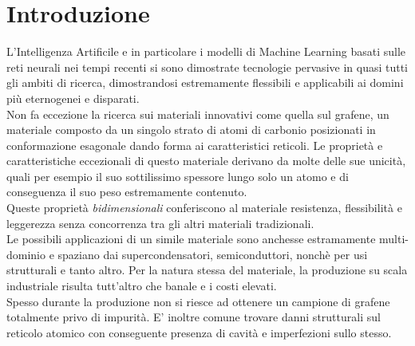 \documentclass[12pt,a4paper,openright,twoside]{report}
\begin{document}
\chapter*{Introduzione}                 %
L'Intelligenza Artificile e in particolare i modelli di Machine Learning basati sulle reti neurali nei tempi recenti si sono dimostrate tecnologie pervasive in quasi tutti gli ambiti di ricerca, dimostrandosi estremamente flessibili e applicabili ai domini più eternogenei e disparati. \\

Non fa eccezione la ricerca sui materiali innovativi come quella sul grafene, un materiale composto da un singolo strato di atomi di carbonio posizionati in conformazione esagonale dando forma ai caratteristici reticoli.
Le proprietà e caratteristiche eccezionali di questo materiale derivano da molte delle sue unicità, quali per esempio il suo sottilissimo spessore lungo solo un atomo e di conseguenza il suo peso estremamente contenuto. \\
Queste proprietà \emph{bidimensionali} conferiscono al materiale resistenza, flessibilità e leggerezza senza concorrenza tra gli altri materiali tradizionali. \\
Le possibili applicazioni di un simile materiale sono anchesse estramamente multi-dominio e spaziano dai supercondensatori, semiconduttori, nonchè per usi strutturali e tanto altro. 
Per la natura stessa del materiale, la produzione su scala industriale risulta tutt'altro che banale e i costi elevati. \\
Spesso durante la produzione non si riesce ad ottenere un campione di grafene totalmente privo di impurità. E' inoltre comune trovare danni strutturali sul reticolo atomico con conseguente presenza di cavità e imperfezioni sullo stesso. \\
\end{document}
